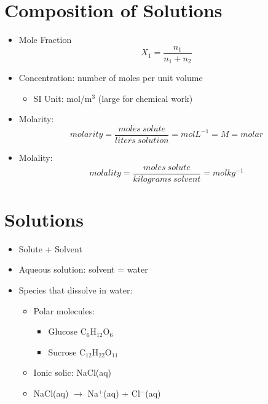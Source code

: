 \documentclass[10pt]{article}
\begin{document}
\section*{Composition of Solutions}
\begin{itemize}
    \item Mole Fraction
    \[X_1 = \frac{n_1}{n_1 + n_2}\]
    \item Concentration: number of moles per unit volume
    \begin{itemize}
        \item SI Unit: mol/m$^3$ (large for chemical work)
    \end{itemize}
    \item Molarity:
    \[molarity = \frac{moles \: solute}{liters \: solution} = mol L^{-1} = M = molar\]
    \item Molality:
    \[molality = \frac{moles \: solute}{kilograms \: solvent} = mol kg^{-1}\]
\end{itemize}

\section*{Solutions}
\begin{itemize}
    \item Solute + Solvent
    \item Aqueous solution: solvent = water
    \item Species that dissolve in water:
        \begin{itemize}
            \item Polar molecules:
            \begin{itemize}
                \item Glucose C$_6$H$_{12}$O$_6$
                \item Sucrose C$_{12}$H$_{22}$O$_{11}$
            \end{itemize}
            \item Ionic solic: NaCl(aq)
            \item NaCl(aq) $\rightarrow$ Na$^+$(aq) + Cl$^-$(aq)
        \end{itemize}
\end{itemize}
\end{document}
